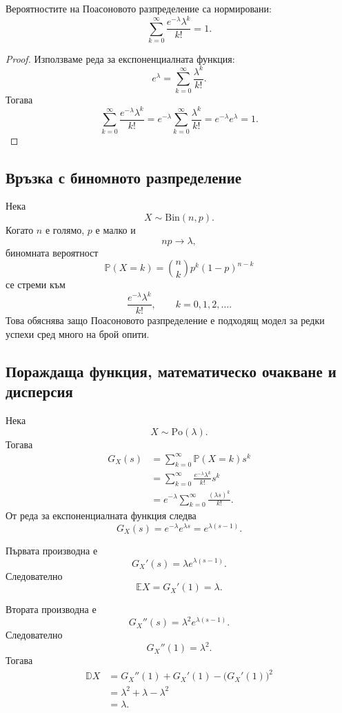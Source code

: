 \begin{prop}
Вероятностите на Поасоновото разпределение са нормировани:
\[
\sum_{k=0}^{\infty}\frac{e^{-\lambda}\lambda^k}{k!}=1.
\]
\end{prop}

\begin{proof}
Използваме реда за експоненциалната функция:
\[
e^\lambda=\sum_{k=0}^{\infty}\frac{\lambda^k}{k!}.
\]
Тогава
\[
\sum_{k=0}^{\infty}\frac{e^{-\lambda}\lambda^k}{k!}
=
e^{-\lambda}
\sum_{k=0}^{\infty}\frac{\lambda^k}{k!}
=
e^{-\lambda}e^\lambda
=
1.
\]
\end{proof}

\subsection{Връзка с биномното разпределение}\label{s:35.5.2}

Нека
\[
X\sim\mathrm{Bin}(n,p).
\]
Когато $n$ е голямо, $p$ е малко и
\[
np\longrightarrow\lambda,
\]
биномната вероятност
\[
\mathbb{P}(X=k)=\binom{n}{k}p^k(1-p)^{n-k}
\]
се стреми към
\[
\frac{e^{-\lambda}\lambda^k}{k!},
\qquad k=0,1,2,\ldots .
\]
Това обяснява защо Поасоновото разпределение е подходящ модел за редки успехи сред много на брой опити.

\subsection{Пораждаща функция, математическо очакване и дисперсия}\label{s:35.5.3}

Нека
\[
X\sim\mathrm{Po}(\lambda).
\]
Тогава
\[
\begin{aligned}
G_X(s)
&=\sum_{k=0}^{\infty}\mathbb{P}(X=k)s^k\\
&=\sum_{k=0}^{\infty}
\frac{e^{-\lambda}\lambda^k}{k!}s^k\\
&=e^{-\lambda}\sum_{k=0}^{\infty}
\frac{(\lambda s)^k}{k!}.
\end{aligned}
\]
От реда за експоненциалната функция следва
\[
G_X(s)=e^{-\lambda}e^{\lambda s}
=e^{\lambda(s-1)}.
\]

Първата производна е
\[
G_X'(s)=\lambda e^{\lambda(s-1)}.
\]
Следователно
\[
\mathbb{E}X=G_X'(1)=\lambda.
\]

Втората производна е
\[
G_X''(s)=\lambda^2e^{\lambda(s-1)}.
\]
Следователно
\[
G_X''(1)=\lambda^2.
\]
Тогава
\[
\begin{aligned}
\mathbb{D}X
&=G_X''(1)+G_X'(1)-\bigl(G_X'(1)\bigr)^2\\
&=\lambda^2+\lambda-\lambda^2\\
&=\lambda.
\end{aligned}
\]


